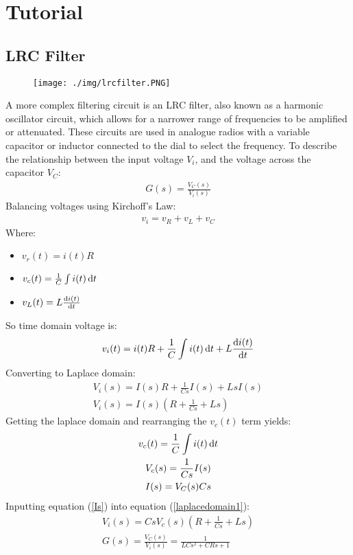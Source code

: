 \section{Tutorial}
\subsection*{LRC Filter}
\begin{figure}[H]
  \centering
  \texttt{[image: ./img/lrcfilter.PNG]}
\end{figure}
A more complex filtering circuit is an LRC filter, also known as a harmonic oscillator circuit, which allows for a narrower range of frequencies to be amplified or attenuated. These circuits are used in analogue radios with a variable capacitor or inductor connected to the dial to select the frequency. To describe the relationship between the input voltage $V_i$, and the voltage across the capacitor $V_C$:
\begin{gather}
  G(s) = \frac{V_C(s)}{V_i(s)}
\end{gather}
Balancing voltages using Kirchoff's Law:
\begin{gather}
  v_i = v_R + v_L + v_C
\end{gather}
Where:
\begin{itemize}
  \item $v_r(t) = i(t)R$
  \item $v_c(t) = \frac{1}{C}\int i(t)\dif t$
  \item $v_L(t) = L\frac{\dif i(t)}{\dif t}$
\end{itemize}
So time domain voltage is:
\begin{gather}
  v_i(t) = i(t)R + \frac{1}{C}\int i(t)\dif t + L\frac{\dif i(t)}{\dif t}
\end{gather}
Converting to Laplace domain:
\begin{gather}
  V_i(s) = I(s)R + \frac{1}{Cs}I(s) + LsI(s) \\
  V_i(s) = I(s) \left(R + \frac{1}{Cs} + Ls\right)
  \label{laplacedomain1}
\end{gather}
Getting the laplace domain and rearranging the $v_c(t)$ term yields:
\begin{gather}
  v_c(t) = \frac{1}{C}\int i(t)\dif t \\
  V_c(s) = \frac{1}{Cs}I(s) \\
  I(s) = V_C(s)Cs \label{Is}
\end{gather}
Inputting equation (\ref{Is}) into equation (\ref{laplacedomain1}):
\begin{gather}
  V_i(s) = CsV_c(s) \left(R + \frac{1}{Cs} + Ls\right) \\
  G(s) = \frac{V_C(s)}{V_i(s)} = \frac{1}{LCs^2 + CRs + 1}
\end{gather}
